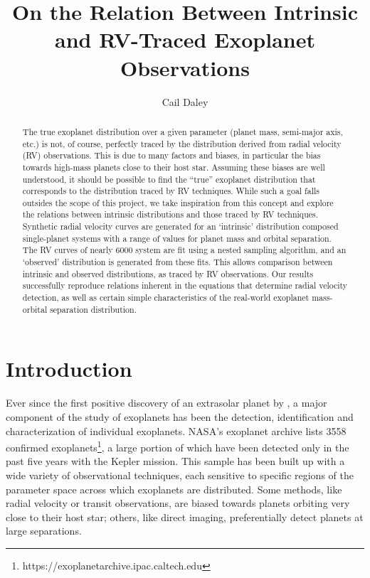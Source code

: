 \documentclass[12pt,manuscript]{aastex}
\begin{document}
\newcommand{\Msun}{M_\odot}
\newcommand{\Lsun}{L_\odot}
\newcommand{\Rsun}{R_\odot}
\newcommand{\Mearth}{M_\oplus}
\newcommand{\Learth}{L_\oplus}
\newcommand{\Rearth}{R_\oplus}
\newcommand{\Mjup}{M_{Jup}}
 
\title{On the Relation Between Intrinsic and RV-Traced Exoplanet Observations}
\author{Cail Daley}


\begin{abstract}
The true exoplanet distribution over a given parameter (planet mass, semi-major axis, etc.)  is not, of course, perfectly traced by the distribution derived from radial velocity (RV) observations. 
This is due to many factors and biases, in particular the bias towards high-mass planets close to their host star. 
Assuming these biases are well understood, it should be possible to find the “true” exoplanet distribution that corresponds to the distribution traced by RV techniques. 
While such a goal falls outsides the scope of this project, we take inspiration from this concept and explore the relations between intrinsic distributions and those traced by RV techniques.
Synthetic radial velocity curves are generated for an `intrinsic' distribution composed single-planet systems with a range of values for planet mass and orbital separation. 
The RV curves of nearly 6000 system are fit using a nested sampling algorithm, and an `observed' distribution is generated from these fits. 
This allows comparison between intrinsic and observed distributions, as traced by RV observations. 
Our results successfully reproduce relations inherent in the equations that determine radial velocity detection, as well as certain simple characteristics of the real-world exoplanet mass-orbital separation distribution.
\end{abstract}


\newpage

\FloatBarrier
\section{Introduction}
\label{section: intro}

Ever since the first positive discovery of an extrasolar planet by \cite{mayor95}, a major component of the study of exoplanets has been the detection, identification and characterization of individual exoplanets.
NASA's exoplanet archive lists 3558 confirmed exoplanets\footnote{https://exoplanetarchive.ipac.caltech.edu}, a large portion of which have been detected only in the past five years with the Kepler mission.
This sample has been built up with a wide variety of observational techniques, each sensitive to specific regions of the parameter space across which exoplanets are distributed. 
Some methods, like radial velocity or transit observations, are biased towards planets orbiting very close to their host star; others, like direct imaging, preferentially detect planets at large separations.
\end{document}
